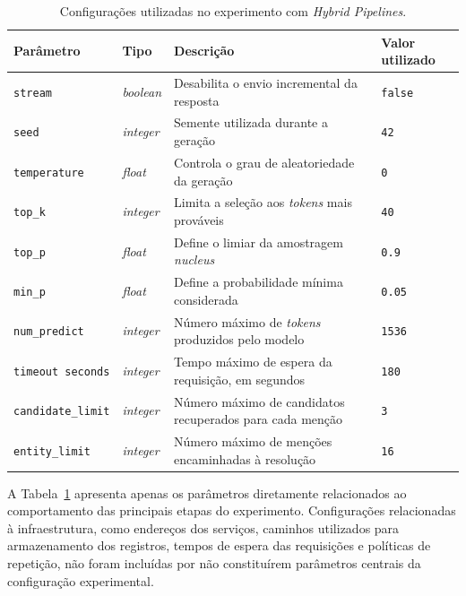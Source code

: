 \begin{table}[htbp]
\centering
\caption{Configurações utilizadas no experimento com \textit{Hybrid Pipelines}.}
\label{tab:llm-config-b}
\small
\renewcommand{\arraystretch}{1.2}

\begin{tabular}{
p{3.2cm}
p{1.5cm}
p{6.0cm}
p{2.0cm}
}
\toprule
\textbf{Parâmetro} &
\textbf{Tipo} &
\textbf{Descrição} &
\textbf{Valor utilizado} \\
\midrule

\texttt{stream}
&
\textit{boolean}
&
Desabilita o envio incremental da resposta
&
\texttt{false}
\\

\texttt{seed}
&
\textit{integer}
&
Semente utilizada durante a geração
&
\texttt{42}
\\

\texttt{temperature}
&
\textit{float}
&
Controla o grau de aleatoriedade da geração
&
\texttt{0}
\\

\texttt{top\_k}
&
\textit{integer}
&
Limita a seleção aos \textit{tokens} mais prováveis
&
\texttt{40}
\\

\texttt{top\_p}
&
\textit{float}
&
Define o limiar da amostragem \textit{nucleus}
&
\texttt{0.9}
\\

\texttt{min\_p}
&
\textit{float}
&
Define a probabilidade mínima considerada
&
\texttt{0.05}
\\

\texttt{num\_predict}
&
\textit{integer}
&
Número máximo de \textit{tokens} produzidos pelo modelo
&
\texttt{1536}
\\

\texttt{timeout seconds}
&
\textit{integer}
&
Tempo máximo de espera da requisição, em segundos
&
\texttt{180}
\\

\texttt{candidate\_limit}
&
\textit{integer}
&
Número máximo de candidatos recuperados para cada menção
&
\texttt{3}
\\

\texttt{entity\_limit}
&
\textit{integer}
&
Número máximo de menções encaminhadas à resolução
&
\texttt{16}
\\

\bottomrule
\end{tabular}
\end{table}

A Tabela~\ref{tab:llm-config-b} apresenta apenas os parâmetros diretamente relacionados ao comportamento das principais etapas do experimento. Configurações relacionadas à infraestrutura, como endereços dos serviços, caminhos utilizados para armazenamento dos registros, tempos de espera das requisições e políticas de repetição, não foram incluídas por não constituírem parâmetros centrais da configuração experimental.

